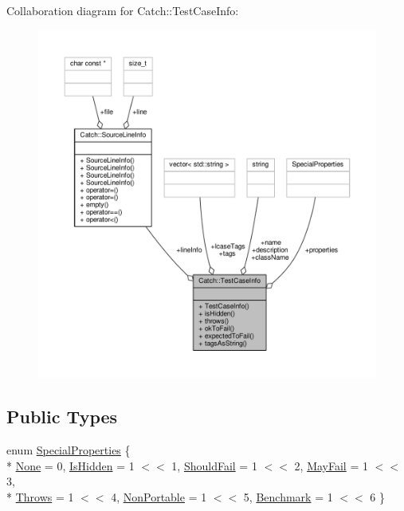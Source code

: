 Collaboration diagram for Catch\-:\-:Test\-Case\-Info\-:
\nopagebreak
\begin{figure}[H]
\begin{center}
\leavevmode
\includegraphics[width=350pt]{struct_catch_1_1_test_case_info__coll__graph}
\end{center}
\end{figure}
\subsection*{Public Types}
\begin{DoxyCompactItemize}
\item 
enum \hyperlink{struct_catch_1_1_test_case_info_a39b232f74b4a7a6f2183b96759027eac}{Special\-Properties} \{ \\*
\hyperlink{struct_catch_1_1_test_case_info_a39b232f74b4a7a6f2183b96759027eacaf94e9de5f8ec1e53b1aa761ec564b31a}{None} = 0, 
\hyperlink{struct_catch_1_1_test_case_info_a39b232f74b4a7a6f2183b96759027eacaeda53906c14c3973e0980900c132b8f7}{Is\-Hidden} = 1 $<$$<$ 1, 
\hyperlink{struct_catch_1_1_test_case_info_a39b232f74b4a7a6f2183b96759027eacaf9002285bccfc343935958f3953f4c01}{Should\-Fail} = 1 $<$$<$ 2, 
\hyperlink{struct_catch_1_1_test_case_info_a39b232f74b4a7a6f2183b96759027eacadf1873d3271121cb9f52d7df45b416ca}{May\-Fail} = 1 $<$$<$ 3, 
\\*
\hyperlink{struct_catch_1_1_test_case_info_a39b232f74b4a7a6f2183b96759027eaca4704adf89ed7f7ad653d08f99813a974}{Throws} = 1 $<$$<$ 4, 
\hyperlink{struct_catch_1_1_test_case_info_a39b232f74b4a7a6f2183b96759027eaca06472887b53fda9eb8015d74e7fd2cf1}{Non\-Portable} = 1 $<$$<$ 5, 
\hyperlink{struct_catch_1_1_test_case_info_a39b232f74b4a7a6f2183b96759027eacad0e25e337246ae34d555fe53baf81c16}{Benchmark} = 1 $<$$<$ 6
 \}
\end{DoxyCompactItemize}
